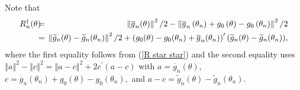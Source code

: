 \documentclass[12pt,titlepage,final,oneside,letterpaper]{article}
\begin{document}
Note that%
\begin{eqnarray}
R_{n}^{\dag }(\theta )\hspace{-0.08in} &=&\hspace{-0.08in}\left\Vert 
\overline{g}_{n}(\theta )\right\Vert ^{2}/2-\left\Vert \overline{g}%
_{n}\left( \theta _{n}\right) +g_{0}\left( \theta \right) -g_{0}\left(
\theta _{n}\right) \right\Vert ^{2}/2  \notag \\
&=&\hspace{-0.08in}\left\Vert \widetilde{g}_{n}(\theta )-\widetilde{g}%
_{n}(\theta _{n})\right\Vert ^{2}/2+\left( g_{0}(\theta )-g_{0}(\theta _{n})+%
\overline{g}_{n}(\theta _{n})\right) ^{\prime }(\widetilde{g}_{n}(\theta )-%
\widetilde{g}_{n}(\theta _{n})),  \label{r star 1}
\end{eqnarray}%
where the first equality follows from (\ref{R star star}) and the second
equality uses $\left\Vert a\right\Vert ^{2}-\left\Vert c\right\Vert
^{2}=\left\Vert a-c\right\Vert ^{2}+2c^{\prime }(a-c)$ with $a=\overline{g}%
_{n}\left( \theta \right) ,$ $c=\overline{g}_{n}(\theta _{n})+g_{0}(\theta
)-g_{0}(\theta _{n}),$ and $a-c=\widetilde{g}_{n}(\theta )-\widetilde{g}%
_{n}(\theta _{n}).$
\end{document}
